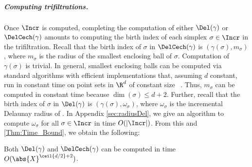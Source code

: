 \subparagraph{Computing trifiltrations.} 
Once $\Incr$ is computed, completing the computation of either $\Del(\gamma)$ or
$\DelCech(\gamma)$ amounts to computing the birth index of each simplex $\sigma\in\Incr$ in the trifiltration.
Recall that the birth index of $\sigma$ in $\DelCech(\gamma)$ is $(\gamma(\sigma), m_\sigma)$, where $m_\sigma$ is the radius of the smallest enclosing ball of $\sigma$.  Computation of $\gamma(\sigma)$  is trivial.  In general, smallest enclosing balls can be computed via standard algorithms with efficient implementations that, assuming  $d$ constant, run in constant time on point sets in $\R^d$ of constant size~\cite{welzlSmallestEnclosingDisks1991,fischerFastSmallestEnclosingBallComputation2003,fischerSmallestEnclosingBall2004,gartnerFastRobustSmallest1999,cgal:fghhs-bv-24a} .  Thus, $m_\sigma$ can be computed in constant time because $\dim(\sigma)\leq d+2$.  Further, recall that the birth index of $\sigma$ in $\Del(\gamma)$ is $(\gamma(\sigma), \omega_\sigma)$, where $\omega_\sigma$ is the incremental Delaunay radius of .  In Appendix \ref{sec:radiusDel}, we give an algorithm to compute $\omega_\sigma$  for all $\sigma\in\Incr$ in time $O(|\Incr|)$.  From this and \cref{Thm:Time_Bound}, we obtain the following:
%
\begin{corollary}\label{Thm:Filtration_Time_Bound}
Both  $\Del(\gamma)$ and $\DelCech(\gamma)$ can be computed in time $O(\abs{X}^{\ceil{d/2}+2})$.
\end{corollary}
%
%

